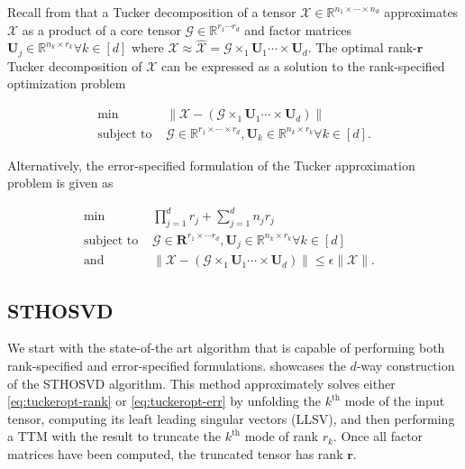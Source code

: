 
Recall from  that a Tucker
decomposition of a tensor $\mathcal{X}\in \mathbb{R}^{n_1\times \cdots \times
n_d}$ approximates $\mathcal{X}$ as a product of a core tensor $\mathcal{G} \in
\mathbb{R}^{r_1 \cdots r_d}$ and factor matrices $\mathbf{U}_j \in
\mathbb{R}^{n_k\times r_k} \forall k \in [d]$ where $\mathcal{X} \approx
\mathcal{\hat{X}} = \mathcal{G} \times_1 \mathbf{U}_1 \cdots \times
\mathbf{U}_d$. The optimal rank-$\mathbf{r}$ Tucker decomposition of
$\mathcal{X}$ can be expressed as a solution to the rank-specified optimization problem

\begin{equation}\label{eq:tuckeropt-rank}
    \begin{aligned}
        \min \quad & \| \mathcal{X} - (\mathcal{G} \times_1 \mathbf{U}_1 \cdots \times \mathbf{U}_d)\| \\ 
        \text{subject to } &\mathcal{G} \in \mathbb{R}^{r_1\times \cdots \times r_d}, \mathbf{U}_{k} \in \mathbb{R}^{n_k\times r_k} \forall k\in [d].
    \end{aligned}
\end{equation}

Alternatively, the error-specified formulation of the Tucker approximation
problem is given as

\begin{equation}\label{eq:tuckeropt-err}
    \begin{aligned}
        \min \quad & \prod_{j=1}^d r_j + \sum_{j=1}^d n_jr_j & \\ 
        \text{subject to } &\mathcal{G} \in \mathbf{R}^{r_1\times \cdots r_d}, \mathbf{U}_{j} \in \mathbb{R}^{n_k\times r_k} \forall k\in [d] \\
        \text{and}\quad  & \| \mathcal{X} - (\mathcal{G} \times_1 \mathbf{U}_1 \cdots \times \mathbf{U}_d) \| \leq \epsilon \|\mathcal{X}\|.
    \end{aligned}
\end{equation}

\subsection{STHOSVD} \label{sec:sthosvd} 

    We start with the state-of-the art algorithm that is capable of performing
    both rank-specified and error-specified formulations. 
    showcases the $d$-way construction of the STHOSVD algorithm. This method
    approximately solves either \cref{eq:tuckeropt-rank} or
    \cref{eq:tuckeropt-err} by unfolding the $k^\text{th}$ mode of the input
    tensor, computing its leaft leading singular vectors (LLSV), and then
    performing a TTM with the result to truncate the $k^\text{th}$ mode of rank
    $r_k$. Once all factor matrices have been computed, the truncated tensor has
    rank $\mathbf{r}$.

